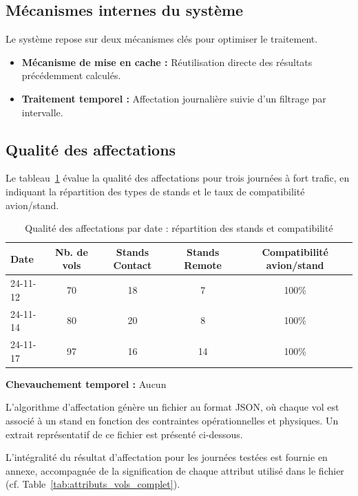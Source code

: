 \subsection*{Mécanismes internes du système}

Le système repose sur deux mécanismes clés pour optimiser le traitement.

\begin{itemize}
	\item \textbf{Mécanisme de mise en cache :} Réutilisation directe des résultats précédemment calculés.
	\item \textbf{Traitement temporel :} Affectation journalière suivie d’un filtrage par intervalle.
\end{itemize}
\vspace{-1.5em}
\subsection{Qualité des affectations}

Le tableau~\ref{tab:qualite-affectations} évalue la qualité des affectations pour trois journées à fort trafic, en indiquant la répartition des types de stands et le taux de compatibilité avion/stand.

\begin{table}[H]
	\centering
	\renewcommand{\arraystretch}{1}
	\caption{Qualité des affectations par date : répartition des stands et compatibilité}
	\begin{tabularx}{\textwidth}{l c c c c}
		\toprule
		\textbf{Date} & \textbf{Nb. de vols} & \textbf{Stands Contact} & \textbf{Stands Remote} & \textbf{Compatibilité avion/stand} \\
		\midrule
		24-11-12 & 70 & 18 & 7 & 100\% \\
		24-11-14 & 80 & 20 & 8 & 100\% \\
		24-11-17 & 97 & 16 & 14 & 100\% \\
		\bottomrule
	\end{tabularx}
	\label{tab:qualite-affectations}
\end{table}


\textbf{Chevauchement temporel :} Aucun



L’algorithme d’affectation génère un fichier au format JSON, où chaque vol est associé à un stand en fonction des contraintes opérationnelles et physiques. Un extrait représentatif de ce fichier est présenté ci-dessous.

L’intégralité du résultat d’affectation pour les journées testées est fournie en annexe, accompagnée de la signification de chaque attribut utilisé dans le fichier (cf. Table~\ref{tab:attributs_vols_complet}).


